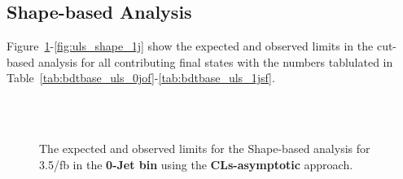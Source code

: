 \subsection{Shape-based Analysis}
Figure~\ref{fig:uls_shape_0j}-\ref{fig:uls_shape_1j} show the expected and observed limits in the cut-based analysis 
for all contributing final states with the numbers tablulated in Table~\ref{tab:bdtbase_uls_0jof}-\ref{tab:bdtbase_uls_1jsf}. 


\begin{figure}[!hbtp]
\centering
{}
\centering
{} \\
\centering
{} \\
\label{fig:uls_shape_0j}
\caption{The expected and observed limits for the Shape-based analysis for 3.5/fb in the {\bf 0-Jet bin} 
using the {\bf CLs-asymptotic} approach. }
\end{figure}
